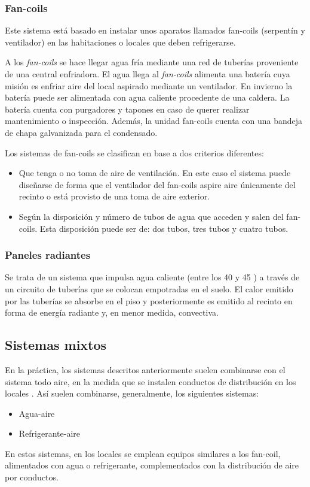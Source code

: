 \subsubsection{Fan-coils}

Este sistema est\'a basado en instalar unos aparatos llamados fan-coils (serpent\'in y ventilador) en las habitaciones o locales que deben refrigerarse.

A los \textit{fan-coils} se hace llegar agua fr\'ia mediante una red de tuber\'ias proveniente de una central enfriadora. El agua llega al \textit{fan-coils} alimenta una bater\'ia cuya misi\'on es enfriar aire del local aspirado mediante un ventilador. En invierno la bater\'ia puede ser alimentada con agua caliente procedente de una caldera. La bater\'ia cuenta con purgadores y tapones en caso de querer realizar mantenimiento o inspecci\'on. Adem\'as, la unidad fan-coils cuenta con una bandeja de chapa galvanizada para el condensado.

Los sistemas de fan-coils se clasifican en base a dos criterios diferentes:
\begin{itemize}
	\item Que tenga o no toma de aire de ventilaci\'on. En este caso el sistema puede diseñarse de forma que el ventilador del fan-coils aspire aire \'unicamente del recinto o est\'a provisto de una toma de aire exterior.
	\item Seg\'un la disposici\'on y n\'umero de tubos de agua que acceden y salen del fan-coils. Esta disposici\'on puede ser de: dos tubos, tres tubos y cuatro tubos.
\end{itemize}

\subsubsection{Paneles radiantes}

Se trata de un sistema que impulsa agua caliente (entre los 40 y 45 \textcelsius) a trav\'es de un circuito de tuber\'ias que se colocan empotradas en el suelo. El calor emitido por las tuber\'ias se absorbe en el piso y posteriormente es emitido al recinto en forma de energ\'ia radiante y, en menor medida, convectiva.
\subsection{Sistemas mixtos}

En la práctica, los sistemas descritos anteriormente suelen combinarse con el sistema todo aire, en la medida que se instalen conductos de distribución en los locales \parencite[pág. 103]{quadri2020}. Así suelen combinarse, generalmente, los siguientes sistemas:
\begin{itemize}
	\item Agua-aire
	\item Refrigerante-aire
\end{itemize}
En estos sistemas, en los locales se emplean equipos similares a los fan-coil, alimentados con agua o refrigerante, complementados con la distribución de aire por conductos.


